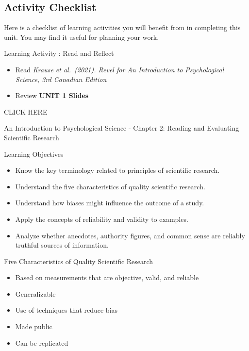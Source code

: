 \documentclass[
]{book}
\providecommand{\tightlist}{%
  \setlength{\itemsep}{0pt}\setlength{\parskip}{0pt}}
\begin{document}
\hypertarget{activity-checklist}{%
\subsection*{Activity Checklist}\label{activity-checklist}}

Here is a checklist of learning activities you will benefit from in completing this unit. You may find it useful for planning your work.

\begin{reflect}
{Learning Activity : Read and Reflect}

\begin{itemize}
\tightlist
\item
  Read \emph{Krause et al.~(2021). Revel for An Introduction to Psychological Science, 3rd Canadian Edition}\\
\item
  Review \textbf{UNIT 1 Slides}
\end{itemize}

CLICK HERE

An Introduction to Psychological Science - Chapter 2: Reading and Evaluating Scientific Research

Learning Objectives

\begin{itemize}
\tightlist
\item
  Know the key terminology related to principles of scientific research.\\
\item
  Understand the five characteristics of quality scientific research.\\
\item
  Understand how biases might influence the outcome of a study.\\
\item
  Apply the concepts of reliability and validity to examples.\\
\item
  Analyze whether anecdotes, authority figures, and common sense are reliably truthful sources of information.
\end{itemize}

Five Characteristics of Quality Scientific Research

\begin{itemize}
\tightlist
\item
  Based on measurements that are objective, valid, and reliable\\
\item
  Generalizable\\
\item
  Use of techniques that reduce bias\\
\item
  Made public\\
\item
  Can be replicated
\end{itemize}


\end{reflect}
\end{document}
